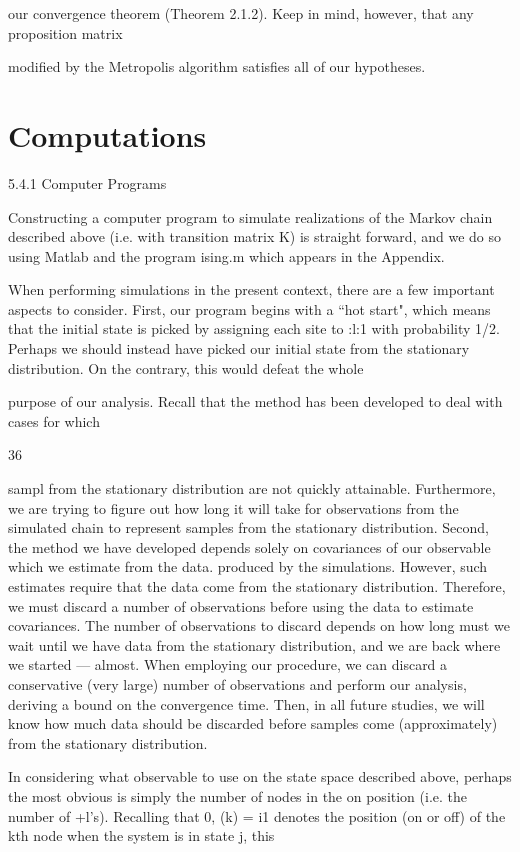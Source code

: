 {our convergence theorem (Theorem 2.1.2). Keep in mind, however, that any proposition matrix

modiﬁed by the Metropolis algorithm satisﬁes all of our hypotheses.

\section{Computations}
\label{sec:computations}
5.4.1 Computer Programs

Constructing a computer program to simulate realizations of the Markov chain described
above (i.e. with transition matrix K) is straight forward, and we do so using Matlab and the
program ising.m which appears in the Appendix.

When performing simulations in the present context, there are a few important aspects
to consider. First, our program begins with a “hot start", which means that the initial state is
picked by assigning each site to :l:1 with probability 1/2. Perhaps we should instead have picked
our initial state from the stationary distribution. On the contrary, this would defeat the whole

purpose of our analysis. Recall that the method has been developed to deal with cases for which

36

sampl from the stationary distribution are not quickly attainable. Furthermore, we are trying to
ﬁgure out how long it will take for observations from the simulated chain to represent samples from
the stationary distribution. Second, the method we have developed depends solely on covariances
of our observable which we estimate from the data. produced by the simulations. However, such
estimates require that the data come from the stationary distribution. Therefore, we must discard a
number of observations before using the data to estimate covariances. The number of observations
to discard depends on how long must we wait until we have data from the stationary distribution,
and we are back where we started — almost. When employing our procedure, we can discard a
conservative (very large) number of observations and perform our analysis, deriving a bound on
the convergence time. Then, in all future studies, we will know how much data should be discarded
before samples come (approximately) from the stationary distribution.

In considering what observable to use on the state space described above, perhaps the
most obvious is simply the number of nodes in the on position (i.e. the number of +l’s). Recalling
that 0, (k) = i1 denotes the position (on or off) of the kth node when the system is in state j, this

}
